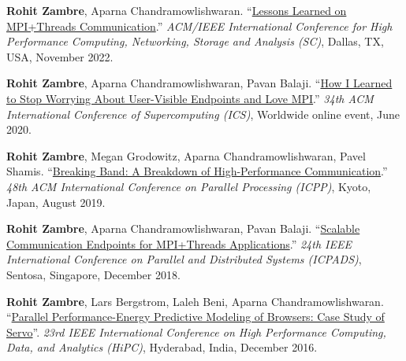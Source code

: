 \documentclass[11pt,article,oneside]{memoir}
\begin{document}
\begin{etaremune}

\item \textbf{Rohit Zambre}, Aparna Chandramowlishwaran. ``\href{https://dl.acm.org/doi/abs/10.5555/3571885.3571987}{Lessons Learned on MPI+Threads Communication}.'' \emph{ACM/IEEE International Conference for High Performance Computing, Networking, Storage and Analysis (SC)}, Dallas, TX, USA, November 2022.

\item \textbf{Rohit Zambre}, Aparna Chandramowlishwaran, Pavan Balaji. ``\href{https://doi.org/10.1145/3392717.3392773}{How I Learned to Stop Worrying About User-Visible Endpoints and Love MPI}.'' \emph{34th ACM International Conference of Supercomputing (ICS)}, Worldwide online event, June 2020.

\item \textbf{Rohit Zambre}, Megan Grodowitz, Aparna Chandramowlishwaran, Pavel Shamis. ``\href{https://doi.org/10.1145/3337821.3337910}{Breaking Band: A Breakdown of High-Performance Communication}.'' \emph{48th ACM International Conference on Parallel Processing (ICPP)}, Kyoto, Japan, August 2019.

\item \textbf{Rohit Zambre}, Aparna Chandramowlishwaran, Pavan Balaji. ``\href{https://doi.org/10.1109/PADSW.2018.8645059}{Scalable Communication Endpoints for MPI+Threads Applications}.'' \emph{24th IEEE International Conference on Parallel and Distributed Systems (ICPADS)}, Sentosa, Singapore, December 2018.

\item \textbf{Rohit Zambre}, Lars Bergstrom, Laleh Beni, Aparna Chandramowlishwaran. ``\href{https://doi.org/10.1109/HiPC.2016.013}{Parallel Performance-Energy Predictive Modeling of Browsers: Case Study of Servo}''. \emph{23rd IEEE International Conference on High Performance Computing, Data, and Analytics (HiPC)}, Hyderabad, India, December 2016.
 
\end{etaremune}

\medskip

\def\labelprefix{P}
\end{document}
